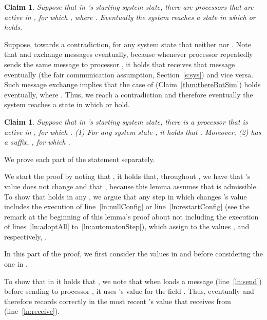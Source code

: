 \documentclass[11pt]{article}
\newtheorem{claim}[theorem]{Claim}
\newenvironment{proof}{\noindent{\bf Proof.}}{\hfill}
\begin{document}
\begin{proof}
\begin{claim}
\label{thm:thereBot}
Suppose that in 's starting system state, there are processors  that are active in , for which , where . Eventually the system reaches a state in which   or  holds. 
\end{claim} 


\begin{proof}
Suppose, towards a contradiction, for any system state  that neither  nor . Note that  and  exchange messages eventually, because whenever processor  repeatedly sends the same message to processor , it holds that  receives that message eventually (the fair communication assumption, Section~\ref{s:sys}) and vice versa. Such message exchange implies that the case of  (Claim~\ref{thm:thereBotSim}) holds eventually, where . Thus, we reach a contradiction and therefore eventually the system reaches a state in which 
  or  hold.
\end{proof}






\begin{claim}
\label{thm:onceBot}
Suppose that in 's starting system state, there is a processor  that is active in , for which . (1) For any system state , it holds that . Moreover, (2)  has a suffix, , for which .
\end{claim} 


\begin{proof}
We prove each part of the statement separately. 

We start the proof by noting that , it holds that, throughout , we have that 's value does not change and that , because this lemma assumes that  is admissible.
To show that  holds in any , we argue that any step  in which  changes 's value includes the execution of line~\ref{ln:nullConfig} or line~\ref{ln:restartConfig} (see the remark at the beginning of this lemma's proof about  not including the execution of lines~\ref{ln:adoptAll} to~\ref{ln:automatonStep}), which assign to  the values , and respectively, . 

 In this part of the proof, we first consider the values in  and  before considering the one in .

To show that in  it holds that , we note that when  loads a message  (line~\ref{ln:send}) before sending to processor , it uses 's value for the field . Thus, eventually  and therefore  records correctly in  the most recent 's value that  receives from  (line~\ref{ln:receive}).


\end{proof}
\end{proof}
\end{document}
